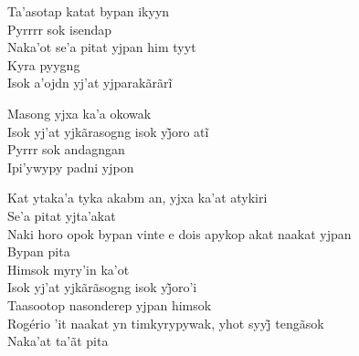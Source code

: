  \smallskip
 \begin{center}\end{center}
 \smallskip
 
\noindent   Ta'asotap katat bypan ikyyn\\
  Pyrrrr sok isendap\\
  Naka'ot se'a pitat yjpan him tyyt\\
  Kyra pyygng\\
  Isok a’ojdn yj’at yjparakãrãrĩ
 
 \smallskip
 \begin{center}\end{center}
 \smallskip
 
\noindent   Masong yjxa ka'a okowak\\
  Isok yj’at yjkãrasogng isok yj̃oro atĩ\\
  Pyrrr sok andagngan\\
  Ipi'ywypy padni yjpon
 
 \smallskip
 \begin{center}\end{center}
 \smallskip
 
\noindent   Kat ytaka'a tyka akabm an, yjxa ka'at atykiri\\
  Se'a pitat yjta'akat\\
  Naki horo opok bypan vinte e dois apykop akat naakat yjpan\\
  Bypan pita\\
  Himsok myry'in ka'ot\\
  Isok yj’at yjkãrãsogng isok yj̃oro’i\\
  Taasootop nasonderep yjpan himsok\\
  Rogério ’it naakat yn timkyrypywak, yhot syyj̃ tengãsok\\
  Naka'at ta'ãt pita
 
